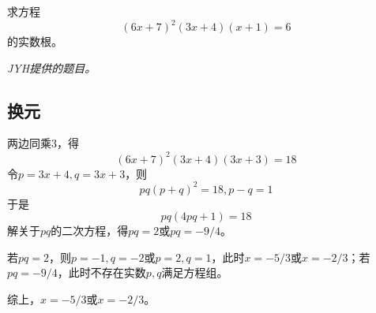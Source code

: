 

求方程
\[ (6x + 7)^2(3x + 4)(x + 1) = 6 \]
的实数根。

\textit{JYH提供的题目。}


\subsection{换元}

两边同乘3，得
\[ (6x + 7)^2(3x + 4)(3x + 3) = 18 \]
令$p = 3x + 4, q = 3x + 3$，则
\[ pq(p + q)^2 = 18, p - q = 1 \]
于是
\[ pq(4pq + 1) = 18 \]
解关于$pq$的二次方程，得$pq = 2$或$pq = -9/4$。

若$pq = 2$，则$p = -1, q = -2$或$p = 2, q = 1$，此时$x = -5/3$或$x = -2/3$；若$pq = -9/4$，此时不存在实数$p, q$满足方程组。

综上，$x = -5/3$或$x = -2/3$。
